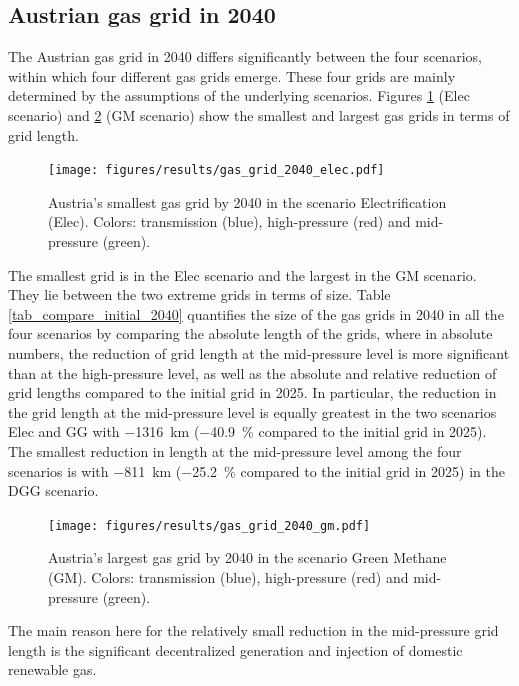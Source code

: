 \subsection{Austrian gas grid in 2040}\label{res_grid2040}
The Austrian gas grid in 2040 differs significantly between the four scenarios, within which four different gas grids emerge. These four grids are mainly determined by the assumptions of the underlying scenarios. Figures \ref{fig_grid_2040_small} (Elec scenario) and \ref{fig_grid_2040_large} (GM scenario) show the smallest and largest gas grids in terms of grid length. 
\begin{figure}[h]
	\centering
	\texttt{[image: figures/results/gas\_grid\_2040\_elec.pdf]}
	\caption{Austria's smallest gas grid by 2040 in the scenario Electrification (Elec). Colors: transmission (blue), high-pressure (red) and mid-pressure (green).}
	\label{fig_grid_2040_small}
\end{figure}

The smallest grid is in the Elec scenario and the largest in the GM scenario. They lie between the two extreme grids in terms of size. Table \ref{tab_compare_initial_2040} quantifies the size of the gas grids in 2040 in all the four scenarios by comparing the absolute length of the grids, where in absolute numbers, the reduction of grid length at the mid-pressure level is more significant than at the high-pressure level, as well as the absolute and relative reduction of grid lengths compared to the initial grid in 2025. In particular, the reduction in the grid length at the mid-pressure level is equally greatest in the two scenarios Elec and GG with \SI{-1316}{km} (\SI{-40.9}{\%} compared to the initial grid in 2025). The smallest reduction in length at the mid-pressure level among the four scenarios is with \SI{-811}{km} (\SI{-25.2}{\%} compared to the initial grid in 2025) in the DGG scenario. 

\begin{figure}[h]
	\centering
	\texttt{[image: figures/results/gas\_grid\_2040\_gm.pdf]}
	\caption{Austria's largest gas grid by 2040 in the scenario Green Methane (GM). Colors: transmission (blue), high-pressure (red) and mid-pressure (green).}
	\label{fig_grid_2040_large}
\end{figure}

The main reason here for the relatively small reduction in the mid-pressure grid length is the significant decentralized generation and injection of domestic renewable gas. 

